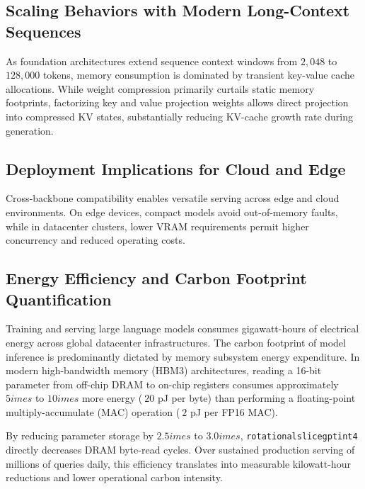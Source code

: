\subsection{Scaling Behaviors with Modern Long-Context Sequences}
As foundation architectures extend sequence context windows from $2{,}048$ to $128{,}000$ tokens, memory consumption is dominated by transient key-value cache allocations. While weight compression primarily curtails static memory footprints, factorizing key and value projection weights allows direct projection into compressed KV states, substantially reducing KV-cache growth rate during generation.

\subsection{Deployment Implications for Cloud and Edge}
Cross-backbone compatibility enables versatile serving across edge and cloud environments. On edge devices, compact models avoid out-of-memory faults, while in datacenter clusters, lower VRAM requirements permit higher concurrency and reduced operating costs.

\subsection{Energy Efficiency and Carbon Footprint Quantification}
Training and serving large language models consumes gigawatt-hours of electrical energy across global datacenter infrastructures. The carbon footprint of model inference is predominantly dictated by memory subsystem energy expenditure. In modern high-bandwidth memory (HBM3) architectures, reading a 16-bit parameter from off-chip DRAM to on-chip registers consumes approximately $5	imes$ to $10	imes$ more energy ($~20$ pJ per byte) than performing a floating-point multiply-accumulate (MAC) operation ($~2$ pJ per FP16 MAC).

By reducing parameter storage by $2.5	imes$ to $3.0	imes$, \texttt{rotationalslicegptint4} directly decreases DRAM byte-read cycles. Over sustained production serving of millions of queries daily, this efficiency translates into measurable kilowatt-hour reductions and lower operational carbon intensity.
